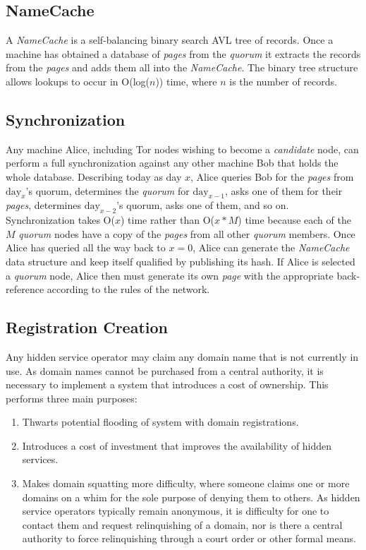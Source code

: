 \subsection{NameCache}

A \emph{NameCache} is a self-balancing binary search AVL tree of records. Once a machine has obtained a database of \emph{pages} from the \emph{quorum} it extracts the records from the \emph{pages} and adds them all into the \emph{NameCache}. The binary tree structure allows lookups to occur in O(log($ n $)) time, where $ n $ is the number of records.

\subsection{Synchronization}


Any machine Alice, including Tor nodes wishing to become a \emph{candidate} node, can perform a full synchronization against any other machine Bob that holds the whole database. Describing today as day $ x $, Alice queries Bob for the \emph{pages} from $ \textrm{day}_{x} $'s quorum, determines the \emph{quorum} for $ \textrm{day}_{x-1} $, asks one of them for their \emph{pages}, determines $ \textrm{day}_{x-2} $'s quorum, asks one of them, and so on. Synchronization takes O($ x $) time rather than O($ x * M $) time because each of the $ M $ \emph{quorum} nodes have a copy of the \emph{pages} from all other \emph{quorum} members. Once Alice has queried all the way back to $ x = 0 $, Alice can generate the \emph{NameCache} data structure and keep itself qualified by publishing its hash. If Alice is selected a \emph{quorum} node, Alice then must generate its own \emph{page} with the appropriate back-reference according to the rules of the network.

\subsection{Registration Creation}

Any hidden service operator may claim any domain name that is not currently in use. As domain names cannot be purchased from a central authority, it is necessary to implement a system that introduces a cost of ownership. This performs three main purposes: 

\begin{enumerate}
	\item Thwarts potential flooding of system with domain registrations.
	\item Introduces a cost of investment that improves the availability of hidden services.
	\item Makes domain squatting more difficulty, where someone claims one or more domains on a whim for the sole purpose of denying them to others. As hidden service operators typically remain anonymous, it is difficulty for one to contact them and request relinquishing of a domain, nor is there a central authority to force relinquishing through a court order or other formal means.
\end{enumerate}

